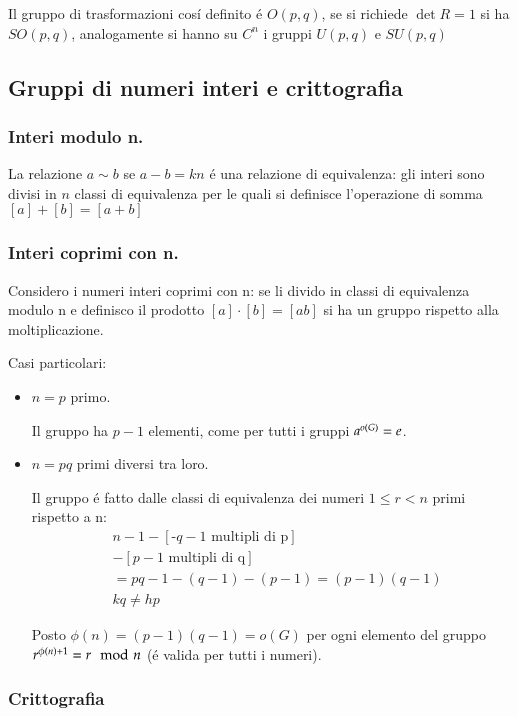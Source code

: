\documentclass[oneside,12pt]{memoir}
\begin{document}
Il gruppo di trasformazioni cos\'i definito \'e $O(p,q)$, se si richiede $\det{R}=1$ si ha $SO(p,q)$, analogamente si hanno su $C^n$ i gruppi $U(p,q)$ e $SU(p,q)$

\subsection{Gruppi di numeri interi e crittografia}

\subsubsection{Interi modulo n.}

La relazione $a\sim b$ se $a-b=kn$ \'e una relazione di equivalenza: gli interi sono divisi in $n$ classi di equivalenza per le quali si definisce l'operazione di somma $[a]+[b]=[a+b]$

\subsubsection{Interi coprimi con n.}

Considero i numeri interi coprimi con n: se li divido in classi di equivalenza modulo n e definisco il prodotto $[a]\cdot [b]=[ab]$ si ha un gruppo rispetto alla moltiplicazione.

Casi particolari:

\begin{itemize}
\item $n=p$ primo.

Il gruppo ha $p-1$ elementi, come per tutti i gruppi $a^{o(G)}=e$.

\item $n=pq$ primi diversi tra loro.

Il gruppo \'e fatto dalle classi di equivalenza dei numeri $1\leq r<n$ primi rispetto a n:
\begin{align*}
&n-1-[\text{-$q-1$ multipli di p}]\\
&-[\text{$p-1$ multipli di q}]\\
&=pq-1-(q-1)-(p-1)=(p-1)(q-1)\\
&kq\neq hp
\end{align*}

Posto $\phi(n)=(p-1)(q-1)=o(G)$ per ogni elemento del gruppo $r^{\phi(n)+1}=r \mod{n}$ (\'e valida per tutti i numeri).

\end{itemize}

\subsubsection{Crittografia}
\end{document}
